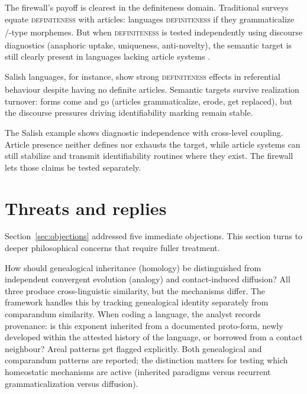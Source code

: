 \documentclass[12pt]{article}
\begin{document}
The firewall's payoff is clearest in the definiteness domain. Traditional surveys equate \textsc{definiteness}\textsubscript{\Cross} with articles: languages  \textsc{definiteness}\textsubscript{\Cross} if they grammaticalize /-type morphemes. But when \textsc{definiteness}\textsubscript{\Cross} is tested independently using discourse diagnostics (anaphoric uptake, uniqueness, anti-novelty), the semantic target is still clearly present in languages lacking article systems \parencite{lyons1999,Matthewson2004}.

Salish languages, for instance, show strong \textsc{definiteness}\textsubscript{\Cross} effects in referential behaviour despite having no definite articles. Semantic targets survive realization turnover: forms come and go (articles grammaticalize, erode, get replaced), but the discourse pressures driving identifiability marking remain stable.

The Salish example shows diagnostic independence with cross-level coupling. Article presence neither defines nor exhausts the target, while article systems can still stabilize and transmit identifiability routines where they exist. The firewall lets those claims be tested separately.

\section{Threats and replies}\label{sec:threats}

Section~\ref{sec:objections} addressed five immediate objections. This section turns to deeper philosophical concerns that require fuller treatment.

How should genealogical inheritance (homology) be distinguished from independent convergent evolution (analogy) and contact-induced diffusion? All three produce cross-linguistic similarity, but the mechanisms differ. The framework handles this by tracking genealogical identity separately from comparandum similarity. When coding a language, the analyst records provenance: is this exponent inherited from a documented proto-form, newly developed within the attested history of the language, or borrowed from a contact neighbour? Areal patterns get flagged explicitly. Both genealogical and comparandum patterns are reported; the distinction matters for testing which homeostatic mechanisms are active (inherited paradigms versus recurrent grammaticalization versus diffusion).
\end{document}
